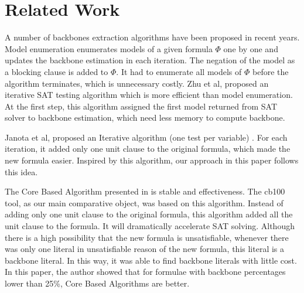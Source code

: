 \section{Related Work}\label{sec:relw}

A number of backbones extraction algorithms have been proposed in recent years.
Model enumeration \cite{MK2002,RSF2004} enumerates models of a given formula $\Phi$ one by one and updates the backbone estimation in each iteration. The negation of the model as a blocking clause is added to $\Phi$. It had to enumerate all models of $\Phi$ before the algorithm terminates, which is unnecessary costly.
Zhu et al, proposed an iterative SAT testing algorithm \cite{Z11} which is more efficient than model enumeration. At the first step, this algorithm assigned the first model returned from SAT solver to backbone estimation, which need less memory to compute backbone.

Janota et al, proposed an Iterative algorithm (one test per variable) \cite{JLM15}. For each iteration, it added only one unit clause to the original formula, which made the new formula easier. Inspired by this algorithm, our approach in this paper follows this idea.

The Core Based Algorithm presented in \cite{JLM15} is stable and effectiveness. The cb100 tool, as our main comparative object, was based on this algorithm. Instead of adding only one unit clause to the original formula, this algorithm added all the unit clause to the formula. It will dramatically accelerate SAT solving. Although there is a high possibility that the new formula is unsatisfiable, whenever there was only one literal in unsatisfiable reason of the new formula, this literal is a backbone literal. In this way, it was able to find backbone literals with little cost. In this paper, the author showed that for formulae with backbone percentages lower than 25\%, Core Based Algorithms are better.


